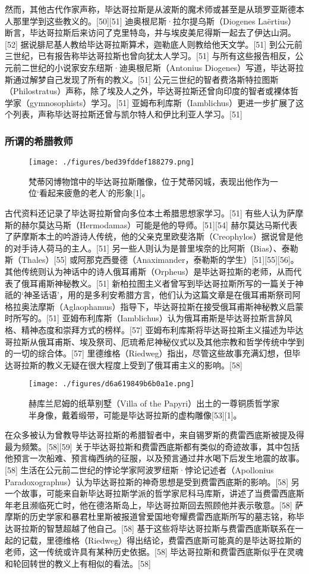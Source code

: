然而，其他古代作家声称，毕达哥拉斯是从波斯的魔术师或甚至是从琐罗亚斯德本人那里学到这些教义的。[50][51] 迪奥根尼斯·拉尔提乌斯（Diogenes Laërtius）断言，毕达哥拉斯后来访问了克里特岛，并与埃皮美尼得斯一起去了伊达山洞。[52] 据说腓尼基人教给毕达哥拉斯算术，迦勒底人则教给他天文学。[51] 到公元前三世纪，已有报告称毕达哥拉斯也曾向犹太人学习。[51] 与所有这些报告相反，公元前二世纪的小说家安东纽斯·迪奥根尼斯（Antonius Diogenes）写道，毕达哥拉斯通过解梦自己发现了所有的教义。[51] 公元三世纪的智者费洛斯特拉图斯（Philostratus）声称，除了埃及人之外，毕达哥拉斯还曾向印度的智者或裸体哲学家（gymnosophists）学习。[51] 亚姆布利库斯（Iamblichus）更进一步扩展了这个列表，声称毕达哥拉斯还曾与凯尔特人和伊比利亚人学习。[51]
\subsubsection{所谓的希腊教师}
\begin{figure}[ht]
\centering
\texttt{[image: ./figures/bed39fddef188279.png]}
\caption{梵蒂冈博物馆中的毕达哥拉斯雕像，位于梵蒂冈城，表现出他作为一位‘看起来疲惫的老人’的形象[1]。} \label{fig_Pythag_3}
\end{figure}
古代资料还记录了毕达哥拉斯曾向多位本土希腊思想家学习。[51] 有些人认为萨摩斯的赫尔莫达马斯（Hermodamas）可能是他的导师。[51][54] 赫尔莫达马斯代表了萨摩斯本土的吟游诗人传统，他的父亲克里欧斐洛斯（Creophylos）据说曾是他的对手诗人荷马的主人。[51] 另一些人则认为是普里埃奈的比阿斯（Bias）、泰勒斯（Thales）[55] 或阿那克西曼德（Anaximander，泰勒斯的学生）[51][55][56]。其他传统则认为神话中的诗人俄耳甫斯（Orpheus）是毕达哥拉斯的老师，从而代表了俄耳甫斯神秘教义。[51] 新柏拉图主义者曾写到毕达哥拉斯所写的一篇关于神祇的‘神圣话语’，用的是多利安希腊方言，他们认为这篇文章是在俄耳甫斯祭司阿格拉奥法摩斯（Aglaophamus）指导下，毕达哥拉斯在接受俄耳甫斯神秘教义启蒙时所写的。[51] 亚姆布利库斯（Iamblichus）认为俄耳甫斯是毕达哥拉斯言辞风格、精神态度和崇拜方式的榜样。[57] 亚姆布利库斯将毕达哥拉斯主义描述为毕达哥拉斯从俄耳甫斯、埃及祭司、厄琉希尼神秘仪式以及其他宗教和哲学传统中学到的一切的综合体。[57] 里德维格（Riedweg）指出，尽管这些故事充满幻想，但毕达哥拉斯的教义无疑在很大程度上受到了俄耳甫主义的影响。[58]
\begin{figure}[ht]
\centering
\texttt{[image: ./figures/d6a619849b6b0a1e.png]}
\caption{赫库兰尼姆的纸草别墅（Villa of the Papyri）出土的一尊铜质哲学家半身像，戴着缎带，可能是毕达哥拉斯的虚构雕像[53][1]。} \label{fig_Pythag_4}
\end{figure}
在众多被认为曾教导毕达哥拉斯的希腊智者中，来自锡罗斯的费雷西底斯被提及得最为频繁。[58][59] 关于毕达哥拉斯和费雷西底斯都有类似的奇迹故事，其中包括他预言一次船难、预言梅西纳的征服，以及预言通过井水喝下后发生地震的故事。[58] 生活在公元前二世纪的悖论学家阿波罗纽斯·悖论记述者（Apollonius Paradoxographus）认为毕达哥拉斯的神奇思想是受到费雷西底斯的影响。[58] 另一个故事，可能来自新毕达哥拉斯学派的哲学家尼科马库斯，讲述了当费雷西底斯年老且濒临死亡时，他在德洛斯岛上，毕达哥拉斯回去照顾他并表示敬意。[58] 萨摩斯的历史学家和暴君杜里斯被报道曾爱国地夸耀费雷西底斯所写的墓志铭，称毕达哥拉斯的智慧超越了他自己。[58] 基于这些将毕达哥拉斯与费雷西底斯联系在一起的记载，里德维格（Riedweg）得出结论，费雷西底斯可能真的是毕达哥拉斯的老师，这一传统或许具有某种历史依据。[58] 毕达哥拉斯和费雷西底斯似乎在灵魂和轮回转世的教义上有相似的看法。[58]

